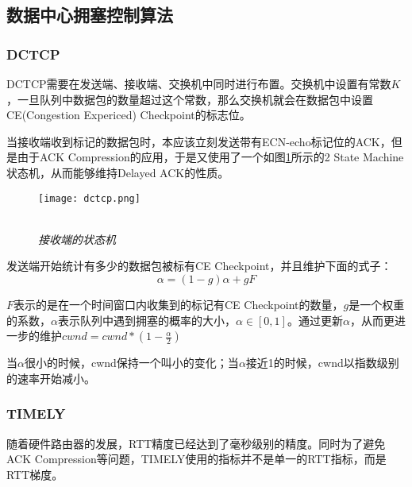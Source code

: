 \documentclass[a4paper, 12pt, UTF8]{ctexart}
\begin{document}
\subsection{数据中心拥塞控制算法}

\subsubsection{DCTCP}

\par DCTCP\cite{DBLP:conf/sigcomm/AlizadehGMPPPSS10}需要在发送端、接收端、交换机中同时进行布置。交换机中设置有常数$K$，一旦队列中数据包的数量超过这个常数，那么交换机就会在数据包中设置CE(Congestion Expericed) Checkpoint的标志位。

\par 当接收端收到标记的数据包时，本应该立刻发送带有ECN-echo标记位的ACK，但是由于ACK Compression的应用，于是又使用了一个如图\ref{fig:dctcp sm algorithm}所示的2 State Machine状态机，从而能够维持Delayed ACK的性质。

\begin{figure}[H]
	\centering \texttt{[image: dctcp.png]}
	\\ \hspace*{\fill} \\
	\caption{\em 接收端的状态机}
	\label{fig:dctcp sm algorithm}
\end{figure}

\par 发送端开始统计有多少的数据包被标有CE Checkpoint，并且维护下面的式子：
$$
\alpha = (1-g)\alpha+gF
$$
\par $F$表示的是在一个时间窗口内收集到的标记有CE Checkpoint的数量，$g$是一个权重的系数，$\alpha$表示队列中遇到拥塞的概率的大小，$\alpha \in [0, 1]$。通过更新$\alpha$，从而更进一步的维护$cwnd = cwnd*(1-\frac{\alpha}{2})$

\par 当$\alpha$很小的时候，cwnd保持一个叫小的变化；当$\alpha$接近1的时候，cwnd以指数级别的速率开始减小。

\subsubsection{TIMELY}
\par 随着硬件路由器的发展，RTT精度已经达到了毫秒级别的精度。同时为了避免ACK Compression等问题，TIMELY\cite{DBLP:conf/sigcomm/MittalLDBWGVWWZ15}使用的指标并不是单一的RTT指标，而是RTT梯度。

\clearpage
\end{document}
